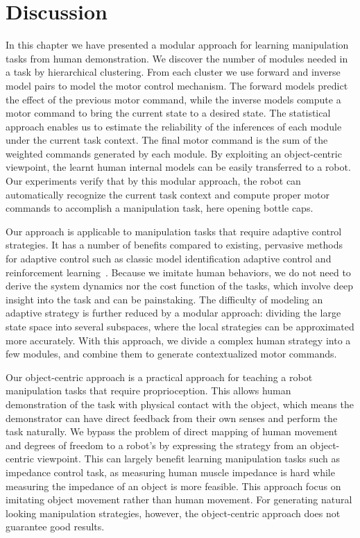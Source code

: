 \section{Discussion}
\label{cha4:sec4}

In this chapter we have presented a modular approach for learning
manipulation tasks from human demonstration. We discover the number of
modules needed in a task by hierarchical clustering. From each cluster
we use forward and inverse model pairs to model the motor control
mechanism. The forward models predict the effect of the previous motor
command, while the inverse models compute a motor command to bring the
current state to a desired state. The statistical approach enables us
to estimate the reliability of the inferences of each module under the
current task context. The final motor command is the sum of the weighted
commands generated by each module. By exploiting an object-centric
viewpoint, the learnt human internal models can be easily transferred
to a robot. Our experiments verify that by this modular approach, the
robot can automatically recognize the current task context and compute
proper motor commands to accomplish a manipulation task, here opening
bottle caps.


Our approach is applicable to manipulation tasks that require adaptive
control strategies. It has a number of benefits compared to existing,
pervasive methods for adaptive control such as classic model
identification adaptive control and reinforcement
learning~\citep{narendra1995adaptation,khalil2004modeling,buchli2011learning}. Because we imitate human behaviors, we do not need to derive the
system dynamics nor the cost function of the tasks, which involve deep
insight into the task and can be painstaking. The difficulty of
modeling an adaptive strategy is further reduced by a modular
approach: dividing the large state space into several subspaces, where
the local strategies can be approximated more accurately. With this
approach, we divide a complex human strategy into a few modules, and
combine them to generate contextualized motor commands.

Our object-centric approach is a practical approach for teaching a
robot manipulation tasks that require proprioception. This allows
human demonstration of the task with physical contact with the object,
which means the demonstrator can have direct feedback from their own
senses and perform the task naturally. We bypass the problem of direct
mapping of human movement and degrees of freedom to a robot's by
expressing the strategy from an object-centric viewpoint. This can
largely benefit learning manipulation tasks such as impedance control
task, as measuring human muscle impedance is hard while measuring the
impedance of an object is more feasible. This approach focus on imitating object movement rather than human movement. For generating natural looking manipulation strategies, however, the object-centric approach does not guarantee good results.

